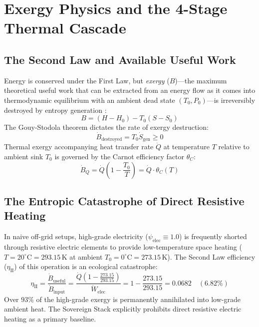 \section{Exergy Physics and the 4-Stage Thermal Cascade}
\label{sec:l1_exergy_cascade}

\subsection{The Second Law and Available Useful Work}

Energy is conserved under the First Law, but \textit{exergy} ($B$)---the maximum theoretical useful work that can be extracted from an energy flow as it comes into thermodynamic equilibrium with an ambient dead state $(T_0, P_0)$---is irreversibly destroyed by entropy generation \parencite{jorgensen2001thermodynamics, carnot1824, georgescu1971}:
\begin{equation}
B = (H - H_0) - T_0 (S - S_0)
\label{eq:exergy_fundamental}
\end{equation}
The Gouy-Stodola theorem dictates the rate of exergy destruction:
\begin{equation}
\dot{B}_{\mathrm{destroyed}} = T_0 \dot{S}_{\mathrm{gen}} \ge 0
\label{eq:gouy_stodola}
\end{equation}
Thermal exergy accompanying heat transfer rate $\dot{Q}$ at temperature $T$ relative to ambient sink $T_0$ is governed by the Carnot efficiency factor $\theta_C$:
\begin{equation}
\dot{B}_Q = \dot{Q} \left(1 - \frac{T_0}{T}\right) = \dot{Q} \cdot \theta_C(T)
\label{eq:carnot_exergy}
\end{equation}

\subsection{The Entropic Catastrophe of Direct Resistive Heating}

In naive off-grid setups, high-grade electricity ($\psi_{\mathrm{elec}} \equiv 1.0$) is frequently shorted through resistive electric elements to provide low-temperature space heating ($T = 20^\circ\mathrm{C} = 293.15\,\mathrm{K}$ at ambient $T_0 = 0^\circ\mathrm{C} = 273.15\,\mathrm{K}$). The Second Law efficiency ($\eta_{\mathrm{II}}$) of this operation is an ecological catastrophe:
\begin{equation}
\eta_{\mathrm{II}} = \frac{\dot{B}_{\mathrm{useful}}}{\dot{B}_{\mathrm{input}}} = \frac{\dot{Q}\left(1 - \frac{273.15}{293.15}\right)}{\dot{W}_{\mathrm{elec}}} = 1 - \frac{273.15}{293.15} = 0.0682 \quad (6.82\%)
\label{eq:second_law_resistive}
\end{equation}
Over $93\%$ of the high-grade exergy is permanently annihilated into low-grade ambient heat. The Sovereign Stack explicitly prohibits direct resistive electric heating as a primary baseline.

